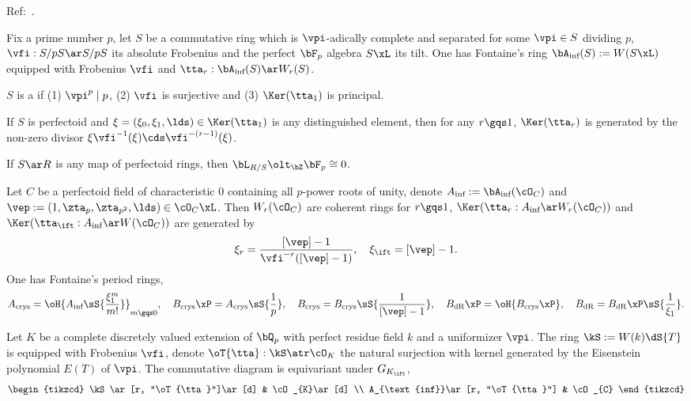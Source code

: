 \documentclass[article, a4paper, twoside]{universal}
\begin{document}
\confighead{}{}{}


Ref:~\cite{BMS2018}.

\begin{stp}
	Fix a prime number $p$, let $S$ be a commutative ring which is $\vpi$-adically complete and separated for some $\vpi\in S$ dividing $p$, $\vfi:S/pS\ar S/pS$ its absolute Frobenius and the perfect $\bF_{p}$ algebra $S\xL$ its tilt. One has Fontaine's ring $\bA_{\text{inf}}(S):=W(S\xL)$ equipped with Frobenius $\vfi$ and $\tta_{r}:\bA_{\text{inf}}(S)\ar W_{r}(S)$.

\end{stp}

\begin{dfn}
	$S$ is a  if (1) $\vpi^{p}\mid p$, (2) $\vfi$ is surjective and (3) $\Ker(\tta_{1})$ is principal.
\end{dfn}

\begin{thm}
	If $S$ is perfectoid and $\xi=(\xi_{0},\xi_{1},\lds)\in\Ker(\tta_{1})$ is any distinguished element, then for any $r\gqs1$, $\Ker(\tta_{r})$ is generated by the non-zero divisor $\xi\vfi^{-1}(\xi)\cds\vfi^{-(r-1)}(\xi)$.

	If $S\ar R$ is any map of perfectoid rings, then $\bL_{R/S}\olt_{\bZ}\bF_{p}\cong0$.
\end{thm}

\begin{thm}
	Let $C$ be a perfectoid field of characteristic $0$ containing all $p$-power roots of unity, denote $A_{\text{inf}}:=\bA_{\text{inf}}(\cO_{C})$ and $\vep:=(1,\zta_{p},\zta_{p^{2}},\lds)\in\cO_{C}\xL$. Then $W_{r}(\cO_{C})$ are coherent rings for $r\gqs1$, $\Ker(\tta_{r}:A_{\text{inf}}\ar W_{r}(\cO_{C}))$ and $\Ker(\tta_{\ift}:A_{\text{inf}}\ar W(\cO_{C}))$ are generated by
	\[
		\xi_{r}=\frac{[\vep]-1}{\vfi^{-r}([\vep]-1)},\quad\xi_{\ift}=[\vep]-1.
	\]
	One has Fontaine's period rings,
	\[
		A_{\text{crys}}=\oH{A_{\text{inf}}\sS{\frac{\xi_{1}^{m}}{m!}}}_{m\gqs0},\quad B_{\text{crys}}\xP=A_{\text{crys}}\sS{\frac{1}{p}},\quad B_{\text{crys}}=B_{\text{crys}}\sS{\frac{1}{[\vep]-1}},\quad B_{\text{dR}}\xP=\oH{B_{\text{crys}}\xP},\quad B_{\text{dR}}=B_{\text{dR}}\xP\sS{\frac{1}{\xi_{1}}}.
	\]
\end{thm}


\begin{stp}
	Let $K$ be a complete discretely valued extension of $\bQ_{p}$ with perfect residue field $k$ and a uniformizer $\vpi$. The ring $\kS:=W(k)\dS{T}$ is equipped with Frobenius $\vfi$, denote $\oT{\tta}:\kS\atr\cO_{K}$ the natural surjection with kernel generated by the Eisenstein polynomial $E(T)$ of $\vpi$. The commutative diagram is equivariant under $G_{K_{\ift}}$,
	\[
		\begin{tikzcd}
			\kS\ar[r, "\oT{\tta}"]\ar[d] & \cO_{K}\ar[d] \\
			A_{\text{inf}}\ar[r, "\oT{\tta}"] & \cO_{C}
		\end{tikzcd}
	\]
\end{stp}
\end{document}
